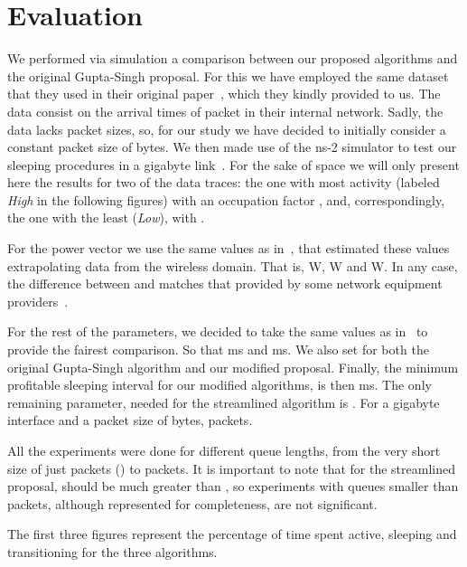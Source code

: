 \documentclass[conference,english]{IEEEtran}
\begin{document}
\section{Evaluation}
\label{sec:evaluation}

We performed via simulation a comparison between our proposed algorithms and
the original Gupta-Singh proposal. For this we have employed the same dataset
that they used in their original
paper~\cite{gupta07:_using_low_power_modes_for}, which they kindly provided to
us. The data consist on the arrival times of packet in their internal network.
Sadly, the data lacks packet sizes, so, for our study we have decided to
initially consider a constant packet size of bytes. We then made use
of the ns-2 simulator to test our sleeping procedures in a gigabyte
link~\cite{ns-2}. For the sake of space we will only present here the results
for two of the data traces: the one with most activity (labeled \emph{High} in
the following figures) with an occupation factor , and,
correspondingly, the one with the least (\emph{Low}), with .

For the power vector we use the same values as
in~\cite{gupta04:_feasib_study_for_power_manag}, that estimated these values
extrapolating data from the wireless domain. That is, W,
W and W. In any case, the difference
between  and  matches that provided by some network
equipment providers~\cite{08:_nortely}.

For the rest of the parameters, we decided to take the same values as
in~\cite{gupta07:_using_low_power_modes_for} to provide the fairest
comparison. So that ms and ms. 
We also set  for both the original Gupta-Singh algorithm and our
modified proposal.
Finally, the
minimum profitable sleeping interval for our modified algorithms, is then
ms. The only remaining parameter, needed for the streamlined algorithm
is . For a gigabyte interface and a packet size of
bytes, packets.

All the experiments were done for different queue lengths, from the very short
size of just  packets () to  packets. It is important to
note that for the streamlined proposal,  should be much greater than
, so experiments with queues smaller than packets, although
represented for completeness, are not significant.

The first three figures represent the percentage of time spent active,
sleeping and transitioning for the three algorithms.
\end{document}

